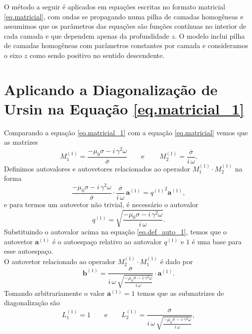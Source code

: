 O m\'etodo a seguir \'e aplicados em equa\c{c}\~oes escritas no formato matricial \ref{eq.matricial}, com ondas se propagando numa pilha de camadas homog\^eneas e assumimos que os par\^ametros das equa\c{c}\~oes s\~ao fun\c{c}\~oes cont\'inuas no interior de cada camada e que dependem apenas da profundidade $z$. O modelo inclui pilha de camadas homog\^eneas com par\^ametros constantes por camada e consideramos o eixo $z$ como sendo positivo no sentido descendente.   

\section{Aplicando a Diagonaliza\c{c}\~ao de Ursin na Equa\c{c}\~ao \ref{eq.matricial_1}}

Comparando a equa\c{c}\~ao \ref{eq.matricial_1} com a equa\c{c}\~ao \ref{eq.matricial} vemos que as matrizes
\begin{equation*}
M^{(1)}_1=\frac{-\mu_0\sigma-i\,\gamma^2\omega}{\overline{\sigma}}\qquad\text{e}\qquad\,M^{(1)}_2=\frac{\overline{\sigma}}{i\,\omega}.
\end{equation*}
Definimos autovalores e autovetores relacionados ao operador $M^{(1)}_1\cdot M^{(1)}_2$ na forma 
\begin{equation}\label{eq.def_auto_1}
\frac{-\mu_0\sigma-i\,\gamma^2\omega}{\overline{\sigma}}\cdot\frac{\overline{\sigma}}{i\,\omega}\,\mathbf{a}^{(1)}={q^{(1)}}^2\mathbf{a}^{(1)},
\end{equation}
e para termos um autovetor n\~ao trivial, \'e necess\'ario o autovalor
\begin{equation*}
q^{(1)}=\sqrt{\frac{-\mu_0\sigma-i\,\gamma^2\omega}{i\,\omega}}.
\end{equation*}
Substituindo o autovalor acima na equa\c{c}\~ao \ref{eq.def_auto_1}, temos que o autovetor $\mathbf{a}^{(1)}$ \'e o autoespa\c{c}o relativo ao autovalor $q^{(1)}$ e ${1}$ \'e uma base para esse autoespa\c{c}o.\\
O autovetor relacionado ao operador $M^{(1)}_2\cdot M^{(1)}_1$ \'e dado por
\begin{equation*}
\mathbf{b}^{(1)}=\frac{\overline{\sigma}}{i\,\omega\,\sqrt{\frac{-\mu_0\sigma-i\,\gamma^2\omega}{i\,\omega}}}\cdot\mathbf{a}^{(1)}.
\end{equation*}
Tomando arbitrariamente o valor $\mathbf{a}^{(1)}=1$ temos que as submatrizes de diagonaliza\c{c}\~ao s\~ao
\begin{equation*}
L^{(1)}_1=1\qquad\text{e}\qquad L^{(1)}_2=\frac{\overline{\sigma}}{i\,\omega\,\sqrt{\frac{-\mu_0\sigma-i\,\gamma^2\omega}{i\,\omega}}},
\end{equation*}
